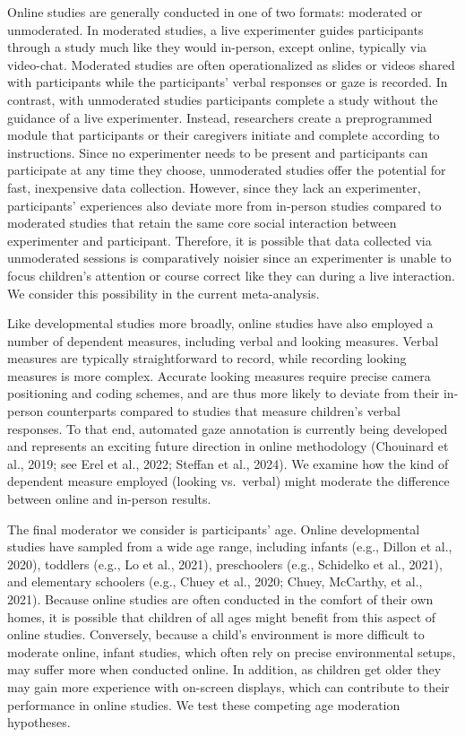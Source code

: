 \documentclass[
  man,floatsintext]{apa6}
\begin{document}
Online studies are generally conducted in one of two formats: moderated or unmoderated. In moderated studies, a live experimenter guides participants through a study much like they would in-person, except online, typically via video-chat. Moderated studies are often operationalized as slides or videos shared with participants while the participants' verbal responses or gaze is recorded. In contrast, with unmoderated studies participants complete a study without the guidance of a live experimenter. Instead, researchers create a preprogrammed module that participants or their caregivers initiate and complete according to instructions. Since no experimenter needs to be present and participants can participate at any time they choose, unmoderated studies offer the potential for fast, inexpensive data collection. However, since they lack an experimenter, participants' experiences also deviate more from in-person studies compared to moderated studies that retain the same core social interaction between experimenter and participant. Therefore, it is possible that data collected via unmoderated sessions is comparatively noisier since an experimenter is unable to focus children's attention or course correct like they can during a live interaction. We consider this possibility in the current meta-analysis.

Like developmental studies more broadly, online studies have also employed a number of dependent measures, including verbal and looking measures. Verbal measures are typically straightforward to record, while recording looking measures is more complex. Accurate looking measures require precise camera positioning and coding schemes, and are thus more likely to deviate from their in-person counterparts compared to studies that measure children's verbal responses. To that end, automated gaze annotation is currently being developed and represents an exciting future direction in online methodology (Chouinard et al., 2019; see Erel et al., 2022; Steffan et al., 2024). We examine how the kind of dependent measure employed (looking vs.~verbal) might moderate the difference between online and in-person results.

The final moderator we consider is participants' age. Online developmental studies have sampled from a wide age range, including infants (e.g., Dillon et al., 2020), toddlers (e.g., Lo et al., 2021), preschoolers (e.g., Schidelko et al., 2021), and elementary schoolers (e.g., Chuey et al., 2020; Chuey, McCarthy, et al., 2021). Because online studies are often conducted in the comfort of their own homes, it is possible that children of all ages might benefit from this aspect of online studies. Conversely, because a child's environment is more difficult to moderate online, infant studies, which often rely on precise environmental setups, may suffer more when conducted online. In addition, as children get older they may gain more experience with on-screen displays, which can contribute to their performance in online studies. We test these competing age moderation hypotheses.
\end{document}
